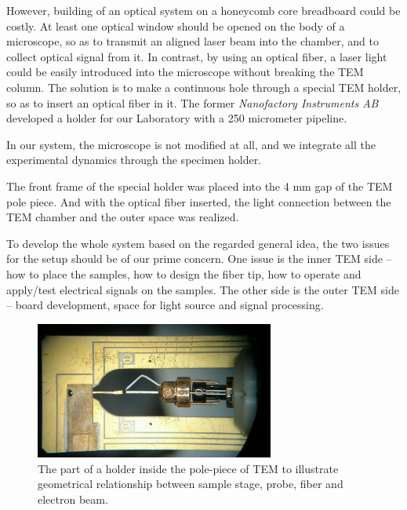 However, building of an optical system on a honeycomb core breadboard could be costly. 
At least one optical window should be opened on the body of a microscope, so as to transmit an aligned laser beam into the chamber, and to collect optical signal from it. 
In contrast, by using an optical fiber, a laser light could be easily introduced into the microscope without breaking the TEM column. 
The solution is to make a continuous hole through a special TEM holder, so as to insert an optical fiber in it. The former {\it Nanofactory Instruments AB} developed a holder for our Laboratory with a 250 micrometer pipeline. 

In our system, the microscope is not modified at all, and we integrate all the experimental dynamics through the specimen holder. 

The front frame of the special holder was placed into the 4 mm gap of the TEM pole
piece. And with the optical fiber inserted, the light connection between the TEM chamber and the outer space was realized. 

To develop the whole system based on the regarded general idea, the two issues for the setup should be of our prime concern. One issue is the inner TEM side – how to place the samples, how to design the fiber tip, how to operate and apply/test electrical signals on the samples. The other side is the outer TEM side – board development, space for light source and signal processing.  

\begin{figure}  
\centering
\includegraphics[width=0.7\textwidth]{figures/figure2_holderframe}
\caption[Inner part of the holder]{The part of a holder inside the pole-piece of TEM to illustrate geometrical relationship between sample stage, probe, fiber and electron beam.
\label{fig:2_frame}}
\end{figure}

